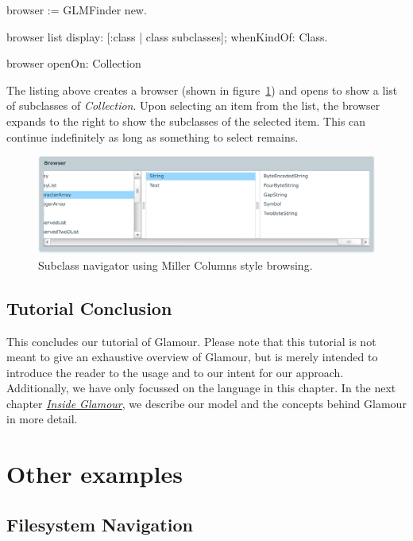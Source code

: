 \documentclass[a4paper,10pt,twoside]{book}
\begin{document}
\begin{code}{}
browser := GLMFinder new.

browser list
  display: [:class | class subclasses];
  whenKindOf: Class.

browser openOn: Collection
\end{code}

The listing above creates a browser (shown in figure~\ref{fig:finder})
and opens to show a list of subclasses of \emph{Collection}. Upon
selecting an item from the list, the browser expands to the right to
show the subclasses of the selected item. This can continue
indefinitely as long as something to select remains.

\begin{figure}[htbp]
\centerline{\includegraphics[width=\linewidth]{finder.pdf}}
\caption{Subclass navigator using Miller Columns style browsing.}
\label{fig:finder}
\end{figure}

\subsection{Tutorial Conclusion}

This concludes our tutorial of Glamour. Please note that this tutorial
is not meant to give an exhaustive overview of Glamour, but is merely
intended to introduce the reader to the usage and to our intent for
our approach. Additionally, we have only focussed on the language in
this chapter. In the next chapter \hyperref[chp:design]{\emph{Inside
    Glamour}}, we describe our model and the concepts behind Glamour
in more detail.



\section{Other examples}

\subsection{Filesystem Navigation}
\end{document}
